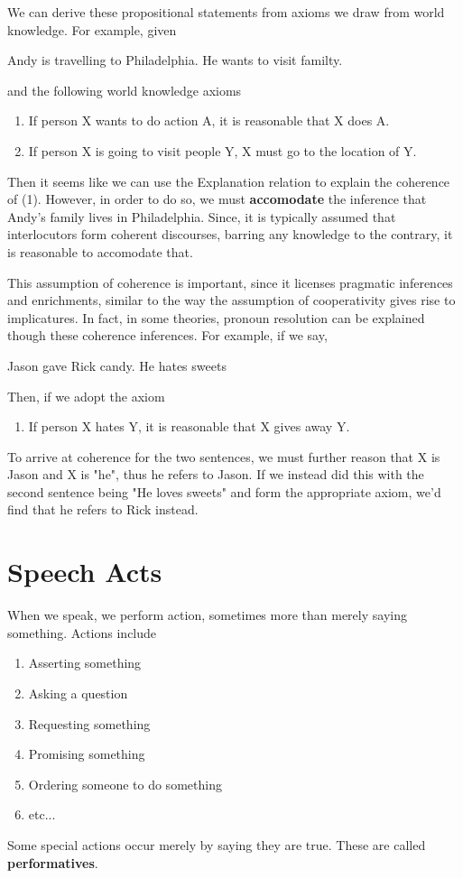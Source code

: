 \documentclass[11pt]{article}
\begin{document}
We can derive these propositional statements from axioms we draw from world knowledge. For example, given
\begin{exe}
    \ex Andy is travelling to Philadelphia. He wants to visit familty.
\end{exe}
and the following world knowledge axioms
\begin{enumerate}
    \item If person X wants to do action A, it is reasonable that X does A.
    \item If person X is going to visit people Y, X must go to the location of Y.
\end{enumerate}
Then it seems like we can use the Explanation relation to explain the coherence of (1). However, in order
to do so, we must \textbf{accomodate} the inference that Andy's family lives in Philadelphia. Since, it
is typically assumed that interlocutors form coherent discourses, barring any knowledge to the contrary,
it is reasonable to accomodate that.

This assumption of coherence is important, since it licenses pragmatic inferences and enrichments, similar
to the way the assumption of cooperativity gives rise to implicatures. In fact, in some theories, pronoun
resolution can be explained though these coherence inferences. For example, if we say,
\begin{exe}
    \ex Jason gave Rick candy. He hates sweets
\end{exe}

Then, if we adopt the axiom

\begin{enumerate}
    \item If person X hates Y, it is reasonable that X gives away Y.
\end{enumerate}

To arrive at coherence for the two sentences, we must further reason that X is Jason and X is "he", thus
he refers to Jason. If we instead did this with the second sentence being "He loves sweets" and form the
appropriate axiom, we'd find that he refers to Rick instead.

\section{Speech Acts}
When we speak, we perform action, sometimes more than merely saying something. Actions include
\begin{enumerate}
    \item Asserting something
    \item Asking a question
    \item Requesting something
    \item Promising something
    \item Ordering someone to do something
    \item etc...
\end{enumerate}
Some special actions occur merely by saying they are true. These are called \textbf{performatives}.
\end{document}
